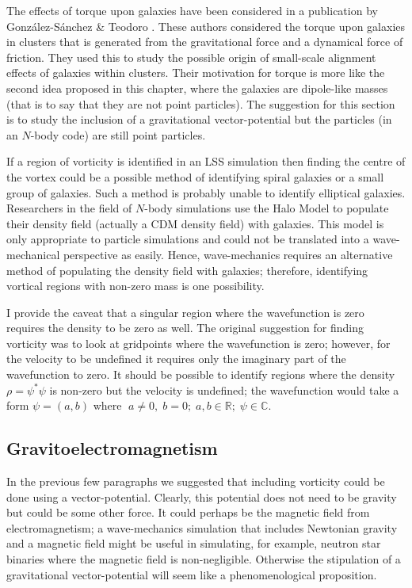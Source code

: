 The effects of torque upon galaxies have been considered in a publication by Gonz\'alez-S\'anchez \& Teodoro \citep{bib_gonz}. These authors considered the torque upon galaxies in clusters that is generated from the gravitational force and a dynamical force of friction. They used this to study the possible origin of small-scale alignment effects of galaxies within clusters. Their motivation for torque is more like the second idea proposed in this chapter, where the galaxies are dipole-like masses (that is to say that they are not point particles). The suggestion for this section is to study the inclusion of a gravitational vector-potential but the particles (in an $N$-body code) are still point particles.

If a region of vorticity is identified in an LSS simulation then finding the centre of the vortex could be a possible method of identifying spiral galaxies or a small group of galaxies. Such a method is probably unable to identify elliptical galaxies. Researchers in the field of $N$-body simulations use the Halo Model \citep{bib_halo} to populate their density field (actually a CDM density field) with galaxies. This model is only appropriate to particle simulations and could not be translated into a wave-mechanical perspective as easily. Hence, wave-mechanics requires an alternative method of populating the density field with galaxies; therefore, identifying vortical regions with non-zero mass is one possibility.

I provide the caveat that a singular region where the wavefunction is zero requires the density to be zero as well. The original suggestion for finding vorticity was to look at gridpoints where the wavefunction is zero; however, for the velocity to be undefined it requires only the imaginary part of the wavefunction to zero. It should be possible to identify regions where the density $\rho = \psi^*\psi$ is non-zero but the velocity is undefined; the wavefunction would take a form $\psi = (a,b)$ where $\; a \neq 0,\; b = 0;\; a, b\in\mathbb{R}; \;\psi\in\mathbb{C}$.

\subsection{Gravitoelectromagnetism}
\label{GEM}
In the previous few paragraphs we suggested that including vorticity could be done using a vector-potential. Clearly, this potential does not need to be gravity but could be some other force. It could perhaps be the magnetic field from electromagnetism; a wave-mechanics simulation that includes Newtonian gravity and a magnetic field might be useful in simulating, for example, neutron star binaries where the magnetic field is non-negligible. Otherwise the stipulation of a gravitational vector-potential will seem like a phenomenological proposition.

